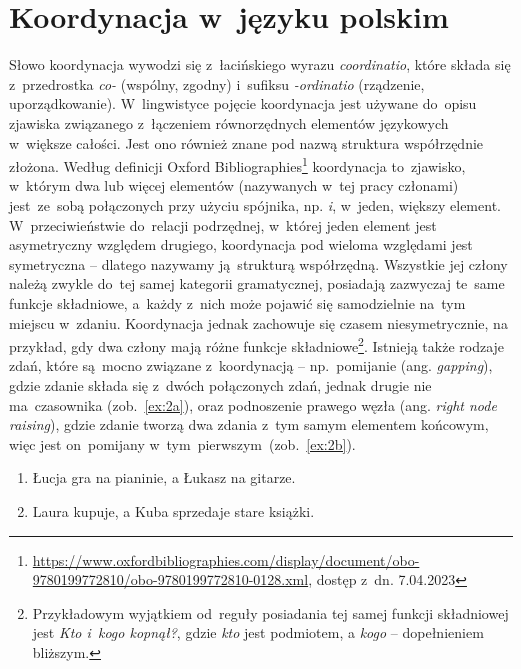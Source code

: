\documentclass[licencjacka]{pracamgr_Kogni}
\begin{document}
    \section{Koordynacja w~języku polskim}\label{sec:koordynacja-wjezyku-polskim}
    Słowo koordynacja wywodzi się z~łacińskiego wyrazu \textit{coordinatio}, które składa się z~przedrostka \textit{co-} (wspólny, zgodny) i~sufiksu \textit{-ordinatio} (rządzenie, uporządkowanie).
    W~lingwistyce pojęcie koordynacja jest używane do~opisu zjawiska związanego z~łączeniem równorzędnych elementów językowych w~większe całości.
    Jest ono również znane pod nazwą struktura współrzędnie złożona.
    Według definicji Oxford Bibliographies\footnote{\url{https://www.oxfordbibliographies.com/display/document/obo-9780199772810/obo-9780199772810-0128.xml}, dostęp z~dn. 7.04.2023} koordynacja to~zjawisko, w~którym dwa lub więcej elementów (nazywanych w~tej pracy członami) jest~ze~sobą połączonych przy użyciu spójnika, np. \textit{i}, w~jeden, większy element.
    W~przeciwieństwie do~relacji podrzędnej, w~której jeden element jest asymetryczny względem drugiego, koordynacja pod wieloma względami jest symetryczna -- dlatego nazywamy ją~strukturą współrzędną.
    Wszystkie jej człony należą zwykle do~tej samej kategorii gramatycznej, posiadają zazwyczaj te~same funkcje składniowe, a~każdy z~nich może pojawić się samodzielnie na~tym miejscu w~zdaniu.
    Koordynacja jednak zachowuje się czasem niesymetrycznie, na przykład, gdy dwa człony mają różne funkcje składniowe\footnote{Przykładowym wyjątkiem od~reguły posiadania tej samej funkcji składniowej jest \textit{Kto i~kogo kopnął?}, gdzie \textit{kto} jest podmiotem, a \textit{kogo} -- dopełnieniem bliższym.}.
    Istnieją także rodzaje zdań, które są~mocno związane z~koordynacją -- np.~pomijanie (ang. \textit{gapping}), gdzie zdanie składa się z~dwóch połączonych zdań, jednak drugie nie ma~czasownika (zob.~\ref{ex:2a}), oraz podnoszenie prawego węzła (ang. \textit{right node raising}), gdzie zdanie tworzą dwa zdania z~tym samym elementem końcowym, więc jest on~pomijany w~tym~pierwszym~(zob.~\ref{ex:2b}).

    \begin{exe}
        \ex
        \begin{enumerate}[label=\alph{enumi}., ref=(2\alph{enumi})]
            \item {Łucja gra na pianinie, a Łukasz na gitarze.
            \label {ex:2a}}
            \item {Laura kupuje, a Kuba sprzedaje stare książki.
            \label {ex:2b}}
        \end{enumerate}
        \label{ex:2}
    \end{exe}
\end{document}
